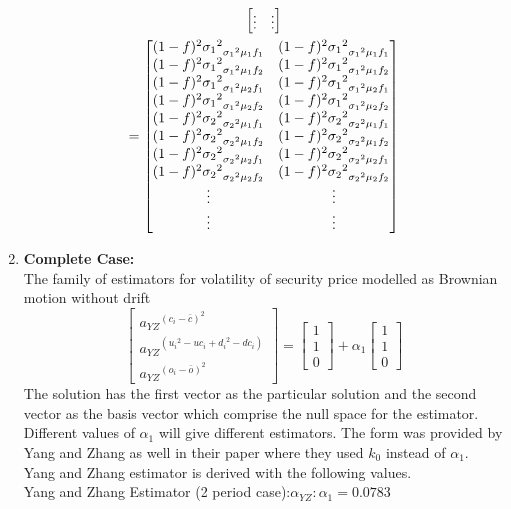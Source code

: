 \documentclass[12pt]{article}   	%
\begin{document}
\begin{enumerate}
\begin{multline}
$$\begin{bmatrix}
\vdots&\vdots
\end{bmatrix}$$\\
$$=\begin{bmatrix}
{(1-f)^2{\sigma_1}^2}_{{\sigma_1}^2 \mu_1 f_1}&{(1-f)^2{\sigma_1}^2}_{{\sigma_1}^2 \mu_1 f_1}\\
{(1-f)^2{\sigma_1}^2}_{{\sigma_1}^2 \mu_1 f_2}&{(1-f)^2{\sigma_1}^2}_{{\sigma_1}^2 \mu_1 f_2}\\
{(1-f)^2{\sigma_1}^2}_{{\sigma_1}^2 \mu_2 f_1}&{(1-f)^2{\sigma_1}^2}_{{\sigma_1}^2 \mu_2 f_1}\\
{(1-f)^2{\sigma_1}^2}_{{\sigma_1}^2 \mu_2 f_2}&{(1-f)^2{\sigma_1}^2}_{{\sigma_1}^2 \mu_2 f_2}\\
{(1-f)^2{\sigma_2}^2}_{{\sigma_2}^2 \mu_1 f_1}&{(1-f)^2{\sigma_2}^2}_{{\sigma_2}^2 \mu_1 f_1}\\
{(1-f)^2{\sigma_2}^2}_{{\sigma_2}^2 \mu_1 f_2}&{(1-f)^2{\sigma_2}^2}_{{\sigma_2}^2 \mu_1 f_2}\\
{(1-f)^2{\sigma_2}^2}_{{\sigma_2}^2 \mu_2 f_1}&{(1-f)^2{\sigma_2}^2}_{{\sigma_2}^2 \mu_2 f_1}\\
{(1-f)^2{\sigma_2}^2}_{{\sigma_2}^2 \mu_2 f_2}&{(1-f)^2{\sigma_2}^2}_{{\sigma_2}^2 \mu_2 f_2}\\
\vdots&\vdots\\
\vdots&\vdots
\end{bmatrix}$$
\end{multline}

\item \textbf{Complete Case:}\\
The family of estimators for volatility of security price modelled as Brownian motion without drift
$$\begin{bmatrix}
{a_{YZ}}^{(c_i-\bar{c})^2}\\
{a_{YZ}}^{({{u_i}^2-uc_i+{d_i}^2-dc_i})}\\
{a_{YZ}}^{(o_i-\bar{o})^2}
\end{bmatrix}=
\begin{bmatrix}
1\\
1\\
0
\end{bmatrix}+\alpha_1
\begin{bmatrix}
1\\
1\\
0
\end{bmatrix}
 $$
 The solution has the first vector as the particular solution and the second vector as the basis vector which comprise the null space for the estimator. Different values of $\alpha_1$ will give different estimators. The form was provided by Yang and Zhang as well in their paper where they used $k_0$ instead of $\alpha_1$. Yang and Zhang estimator is derived with the following values.\\
Yang and Zhang Estimator (2 period case):\quad $\alpha_{YZ}: \alpha_1=0.0783\quad $


\end{enumerate}
\end{document}
